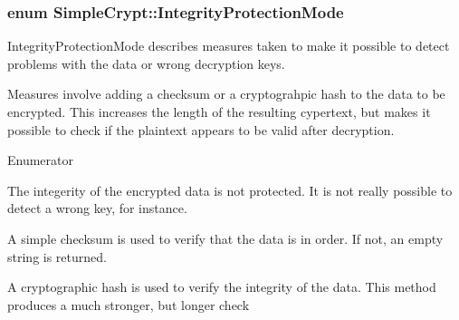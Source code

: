 \hypertarget{class_simple_crypt_a42a5172e558d346b28421cc4e85feb2d}{
\subsubsection[{Integrity\-Protection\-Mode}]{\setlength{\rightskip}{0pt plus 5cm}enum {\bf Simple\-Crypt\-::\-Integrity\-Protection\-Mode}}}\label{class_simple_crypt_a42a5172e558d346b28421cc4e85feb2d}
Integrity\-Protection\-Mode describes measures taken to make it possible to detect problems with the data or wrong decryption keys.

Measures involve adding a checksum or a cryptograhpic hash to the data to be encrypted. This increases the length of the resulting cypertext, but makes it possible to check if the plaintext appears to be valid after decryption. \begin{Desc}
\item[Enumerator]\par
\begin{description}
\item[{\em 
\hypertarget{class_simple_crypt_a42a5172e558d346b28421cc4e85feb2da75547c41ccde1fb3d4db9f8c27164e4c}{Protection\-None}\label{class_simple_crypt_a42a5172e558d346b28421cc4e85feb2da75547c41ccde1fb3d4db9f8c27164e4c}
}]The integerity of the encrypted data is not protected. It is not really possible to detect a wrong key, for instance. \item[{\em 
\hypertarget{class_simple_crypt_a42a5172e558d346b28421cc4e85feb2dab6ccee9e9680f70c79213647c7814e5c}{Protection\-Checksum}\label{class_simple_crypt_a42a5172e558d346b28421cc4e85feb2dab6ccee9e9680f70c79213647c7814e5c}
}]A simple checksum is used to verify that the data is in order. If not, an empty string is returned. \item[{\em 
\hypertarget{class_simple_crypt_a42a5172e558d346b28421cc4e85feb2daf915c42837795744edbc5254eb93154f}{Protection\-Hash}\label{class_simple_crypt_a42a5172e558d346b28421cc4e85feb2daf915c42837795744edbc5254eb93154f}
}]A cryptographic hash is used to verify the integrity of the data. This method produces a much stronger, but longer check \end{description}
\end{Desc}


